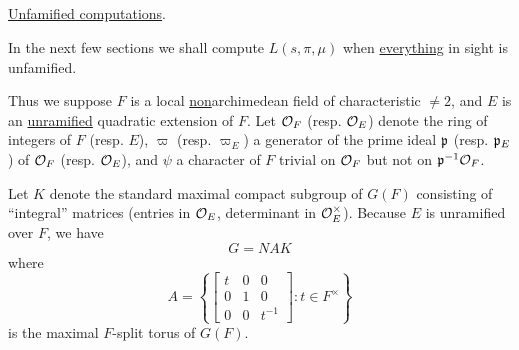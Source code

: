 \subsection{}
\label{sec:4.4}

\underline{Unfamified computations}.

In the next few sections we shall compute $L(s, \pi, \mu)$ when \underline{everything} in sight is unfamified.

Thus we suppose $F$ is a local \underline{non}archimedean field of characteristic $\neq 2$, and $E$ is an \underline{unramified} quadratic extension of $F$.
Let $\mathcal{O}_F$ (resp. $\mathcal{O}_E$) denote the ring of integers of $F$ (resp. $E$), $\varpi$ (resp. $\varpi_E$) a generator of the prime ideal $\mathfrak{p}$ (resp. $\mathfrak{p}_E$) of $\mathcal{O}_F$ (resp. $\mathcal{O}_E$), and $\psi$ a character of $F$ trivial on $\mathcal{O}_F$ but not on $\mathfrak{p}^{-1} \mathcal{O}_F$.

Let $K$ denote the standard maximal compact subgroup of $G(F)$ consisting of ``integral'' matrices (entries in $\mathcal{O}_E$, determinant in $\mathcal{O}_E^\times$).
Because $E$ is unramified over $F$, we have
\[
    G = NAK
\]
where
\[
    A = \left\{
        \begin{bmatrix}
            t & 0 & 0 \\ 0 & 1& 0 \\ 0 & 0 & t^{-1}
        \end{bmatrix}: t \in F^\times
    \right\}
\]
is the maximal $F$-split torus of $G(F)$.
